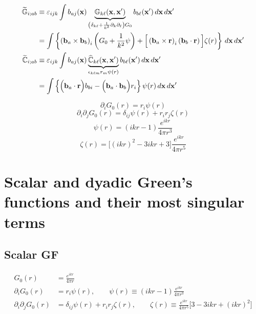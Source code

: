 \documentclass[letterpaper]{article}
\newcommand{\wt}{\widetilde}
\newcommand{\whmb}[1]{\widehat{\mb #1}}
\begin{document}
\begin{align*}
 \wt{\mb G}_{i;ab} 
&\equiv
   \varepsilon_{ijk} 
   \int b_{aj}(\vb x) 
        \underbrace{\mb G_{k\ell}(\vb x, \vb x^\prime)}
                  _{\left(   \delta_{k\ell} 
                            +\frac{1}{k^2}\partial_k \partial_\ell
                    \right)G_0}
        b_{b\ell}(\vb x^\prime) \, d\vb x \, d\vb x^\prime
\\
&=
   \int \left\{\left(\vb b_a \times \vb b_b\right)_i 
               \left(G_0 + \frac{1}{k^2}\psi\right)
               +\Big[\left(\vb b_a \times \vb r\right)_i
                     \left(\vb b_b \cdot \vb r\right)
                \Big]\zeta(r)
        \right\}\,d\vb x \, d\vb x^\prime
\\
 \wt{\mb C}_{i;ab} 
&\equiv
   \varepsilon_{ijk} 
   \int b_{aj}(\vb x) 
        \underbrace{\whmb C_{k\ell}(\vb x, \vb x^\prime)}
                  _{\epsilon_{k\ell m} r_m \psi(r)}
        b_{b\ell}(\vb x^\prime) \, d\vb x \, d\vb x^\prime
\\
&=
   \int\left\{ \Big( \vb b_a \cdot \vb r\Big) b_{bi}
              -\Big( \vb b_a \cdot \vb b_b\Big) r_i
       \right\} \psi(r) \, d\vb x \, d\vb x^\prime
\\
\end{align*}

$$\partial_i G_0(r) = r_i \psi(r) $$
$$\partial_i \partial_j G_0(r) = \delta_{ij}\psi(r) + r_i r_j \zeta(r) $$
$$\psi(r) = (ikr-1)\frac{e^{ikr}}{4\pi r^3}$$
$$\zeta(r) = \Big[ (ikr)^2 - 3ikr + 3\Big] \frac{e^{ikr}}{4\pi r^5}$$

\appendix
\newpage
\section{Scalar and dyadic Green's functions and their most singular terms}

\subsection{Scalar GF}

\begin{align*}
  G_0(r) &= \frac{e^{ikr}}{4\pi r}
\\
 \partial_i G_0(r) &= 
  r_i \psi(r), \qquad \psi(r)\equiv (ikr-1)\frac{e^{ikr}}{4\pi r^3} 
\\
 \partial_i \partial_j G_0(r) &=
  \delta_{ij} \psi(r) + r_i r_j \zeta(r), \qquad
  \zeta(r)\equiv \frac{e^{ikr}}{4\pi r^5}\Big[3 - 3ikr + (ikr)^2\Big]
\end{align*}
\end{document}
